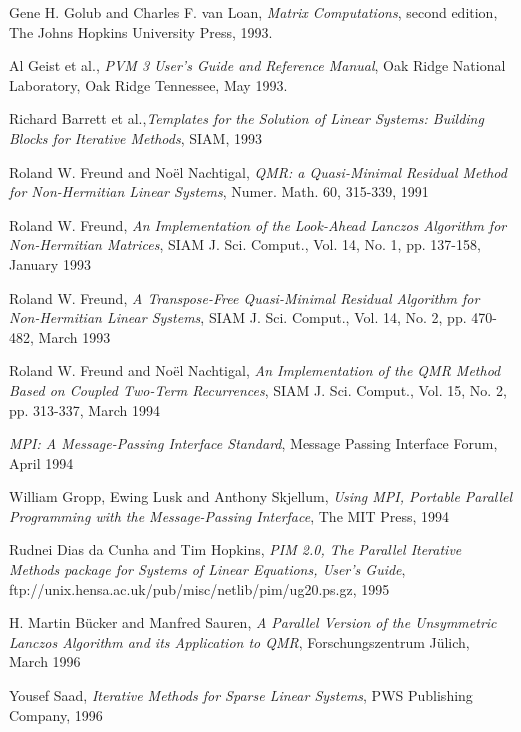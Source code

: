 \documentclass[11pt,a4paper,english,oneside]{report}
\begin{document}
\begin{thebibliography}{1}

	Gene H. Golub and Charles F. van Loan, {\em Matrix Computations},
	second edition, The Johns Hopkins University Press, 1993.

        Al Geist et al., {\em PVM 3 User's Guide and Reference Manual},
        Oak Ridge National Laboratory, Oak Ridge Tennessee, May 1993.

        Richard Barrett et al.,{\em Templates for the Solution of Linear 
        Systems: Building Blocks for Iterative Methods}, SIAM, 1993

        Roland W. Freund and No\"el Nachtigal, {\em QMR: a Quasi-Minimal
        Residual Method for Non-Hermitian Linear Systems}, Numer. Math. 
        60, 315-339, 1991

        Roland W. Freund, {\em An Implementation of the Look-Ahead
	Lanczos Algorithm for Non-Hermitian Matrices},
        SIAM J. Sci. Comput., Vol. 14, No. 1, pp. 137-158, January 1993

        Roland W. Freund, {\em A Transpose-Free Quasi-Minimal Residual
	Algorithm for Non-Hermitian Linear Systems}, 
        SIAM J. Sci. Comput., Vol. 14, No. 2, pp. 470-482, March 1993

        Roland W. Freund and No\"el Nachtigal, {\em An Implementation of the 
        QMR Method Based on Coupled Two-Term Recurrences},
        SIAM J. Sci. Comput., Vol. 15, No. 2, pp. 313-337, March 1994

	{\em MPI: A Message-Passing Interface Standard}, Message
	Passing Interface Forum, April 1994

	William Gropp, Ewing Lusk and Anthony Skjellum, {\em Using MPI,
	Portable Parallel Programming with the Message-Passing Interface},
	The MIT Press, 1994

	Rudnei Dias da Cunha and Tim Hopkins, {\em PIM 2.0, The Parallel
	Iterative Methods package for Systems of Linear Equations, User's
	Guide}, ftp://unix.hensa.ac.uk/pub/misc/netlib/pim/ug20.ps.gz, 1995

	H. Martin B\"{u}cker and Manfred Sauren, {\em A Parallel Version
	of the Unsymmetric Lanczos Algorithm and its Application to QMR},
	Forschungszentrum J\"{u}lich, March 1996

	Yousef Saad, {\em Iterative Methods for Sparse Linear Systems},
	PWS Publishing Company, 1996


\end{thebibliography}
\end{document}
